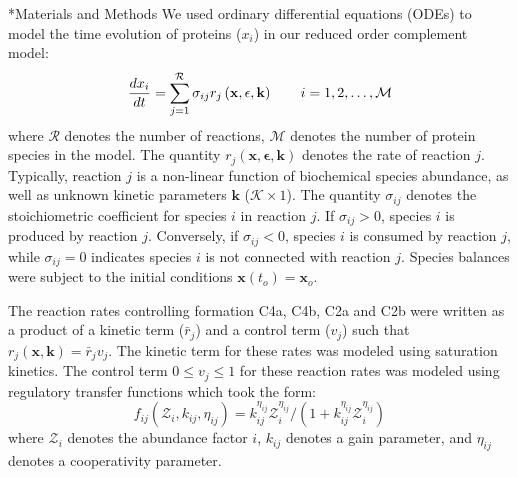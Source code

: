 \documentclass[12pt]{article}
\makeatletter
\renewcommand\section{\@startsection
	{subsection}{2}{0mm}
	{-0.2in}
	{0.05\baselineskip}
	{\normalfont\large\bfseries}}
\makeatother
\begin{document}
\section*{Materials and Methods}
We used ordinary differential equations (ODEs) to model the time evolution of proteins ($x_{i}$) in our reduced order complement model:
\begin{equation}
	\frac{dx_{i}}{dt}  =  \sum_{j = 1}^{\mathcal{R}}\sigma_{ij}r_{j}\left(\mathbf{x},\mathbf{\epsilon},\mathbf{k}\right)\qquad{i=1,2,\hdots,\mathcal{M}}\\
\end{equation}
where $\mathcal{R}$ denotes the number of reactions, $\mathcal{M}$ denotes the number of protein species in the model.
The quantity $r_{j}\left(\mathbf{x},\mathbf{\epsilon},\mathbf{k}\right)$ denotes the rate of reaction $j$.
Typically, reaction $j$ is a non-linear function of biochemical species abundance, as well as unknown kinetic parameters $\mathbf{k}$ ($\mathcal{K}\times{1}$).
The quantity $\sigma_{ij}$ denotes the stoichiometric coefficient for species $i$ in reaction $j$.
If $\sigma_{ij}>0$, species $i$ is produced by reaction $j$.
Conversely, if $\sigma_{ij}<0$, species $i$ is consumed by reaction $j$, while $\sigma_{ij} = 0$ indicates species $i$ is not connected with reaction $j$.
Species balances were subject to the initial conditions $\mathbf{x}\left(t_{o}\right) = \mathbf{x}_{o}$.

The reaction rates controlling formation C4a, C4b, C2a and C2b were written as a product of a kinetic term ($\bar{r}_{j}$) and a control term ($v_{j}$) such that $r_{j}\left(\mathbf{x},\mathbf{k}\right) = \bar{r}_{j}v_{j}$. The kinetic term for these rates was modeled using saturation kinetics.  The control term $0\leq v_{j}\leq 1$ for these reaction rates was modeled using regulatory transfer functions which took the form:
\begin{equation}\label{eqn:control-factor}
	f_{ij}\left(\mathcal{Z}_{i},k_{ij},\eta_{ij}\right) = k_{ij}^{\eta_{ij}}\mathcal{Z}_{i}^{\eta_{ij}}/\left({1 + k_{ij}^{\eta_{ij}}\mathcal{Z}_{i}^{\eta_{ij}}}\right)
\end{equation}where $\mathcal{Z}_{i}$ denotes the abundance factor $i$, $k_{ij}$ denotes a gain parameter, and $\eta_{ij}$ denotes a cooperativity parameter.
\end{document}
